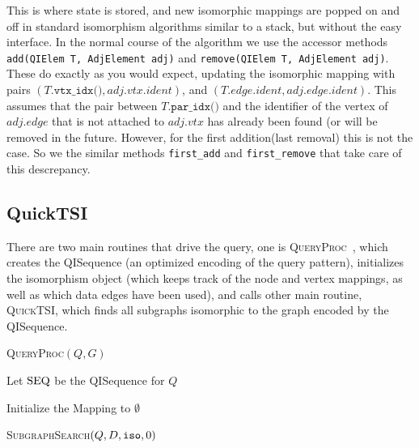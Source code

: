 This is where state is stored, and new isomorphic mappings are popped on and off
in standard isomorphism algorithms similar to a stack, but without the easy
interface. In the normal course of the algorithm we use the accessor methods
\texttt{add(QIElem T, AdjElement adj)} and \texttt{remove(QIElem T, AdjElement
  adj)}. These do exactly as you would expect, updating the isomorphic mapping
with pairs $(T.\texttt{vtx\_idx()}, adj.vtx.ident)$, and $(T.edge.ident,
adj.edge.ident)$. This assumes that the pair between $T.\texttt{par\_idx()}$ and
the identifier of the vertex of $adj.edge$ that is not attached to $adj.vtx$ has
already been found (or will be removed in the future. However, for the first
addition(last removal) this is not the case. So we the similar methods
\texttt{first\_add} and \texttt{first\_remove} that take care of this
descrepancy.


\subsection{QuickTSI}

There are two main routines that drive the query, one is
\textsc{QueryProc}~\cite{alg:query_proc}, which creates the QISequence (an
optimized encoding of the query pattern), initializes the isomorphism object
(which keeps track of the node and vertex mappings, as well as which data edges
have been used), and calls other main routine, \textsc{QuickTSI}, which finds
all subgraphs isomorphic to the graph encoded by the QISequence.

\begin{algorithm}
  \label{alg:query_proc}
  \caption{\textsc{QueryProc}$(Q,G)$}
  \SetAlgoLined

  Let ${\text{SEQ}}$ be the QISequence for $Q$\;
  
  Initialize the Mapping \iso to $\emptyset$\;

  \textsc{SubgraphSearch}$(Q,D,\texttt{iso},0)$\;

  \setcounter{AlgoLine}{0}
  
\end{algorithm}

